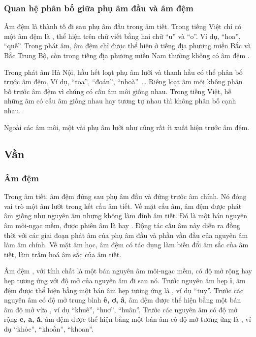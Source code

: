 \documentclass[a4paper,oneside,14pt]{extbook} %
\begin{document}
\subsubsection{Quan hệ phân bố giữa phụ âm đầu và âm đệm}

Âm đệm là thành tố đi sau phụ âm đầu trong âm tiết. Trong tiếng Việt
chỉ có một âm đệm là , thể hiện trên chữ viết bằng hai
chữ ``u'' và ``o''. Ví dụ, ``hoa'', ``quế''. Trong phát âm, âm đệm chỉ
được thể hiện ở tiếng địa phương miền Bắc và Bắc Trung Bộ, còn trong
tiếng địa phương miền Nam thường không có âm đệm .

Trong phát âm Hà Nội, hầu hết loạt phụ âm lưỡi và thanh hầu có thể
phân bố trước âm đệm. Ví dụ, ``toa'', ``đoán'', ``nhoà''~\ldots{} Riêng
loạt âm môi  không phân bố trước âm đệm
 vì chúng có cấu âm môi giống nhau. Trong tiếng Việt,
hễ những âm có cấu âm giống nhau hay tương tự nhau thì không phân bố
cạnh nhau.

Ngoài các âm môi, một vài phụ âm lưỡi như  cũng
rất ít xuất hiện trước âm đệm.

\subsection{Vần}


\subsubsection{Âm đệm}

Trong âm tiết, âm đệm  đứng sau phụ âm đầu và đứng
trước âm chính. Nó đóng vai trò một âm lướt trong kết cấu âm tiết. Về
mặt cấu âm, âm đệm  được phát âm giống như nguyên âm
\textipa{[u]} nhưng không làm đỉnh âm tiết. Đó là một bán nguyên âm
môi-ngạc mềm, được phiên âm là \textipa{[-u-]} hay
\textipa{[-w-]}. Động tác cấu âm này diễn ra đồng thời với các giai
đoạn phát âm của phụ âm đầu và phần vần đầu của nguyên âm làm âm
chính. Về mặt âm học, âm đệm  có tác dụng làm biến đổi
âm sắc của âm tiết, làm trầm hoá âm sắc của âm tiết.

Âm đệm , với tính chất là một bán nguyên âm môi-ngạc
mềm, có độ mở rộng hay hẹp tương ứng với độ mở của nguyên âm đi sau
nó. Trước nguyên âm hẹp \textbf{i}, âm đệm  được thể
hiện bằng một bán âm hẹp tương ứng là \textipa{[u]}, ví dụ
``tuy''. Trước các nguyên âm có độ mở trung bình \textbf{ê, ơ, â}, âm
đệm   được thể hiện bằng một bán âm độ mở vừa
\textipa{[o]}, ví dụ ``khuê'', ``huơ'', ``huân''. Trước các nguyên âm
có độ mở rộng \textbf{e, a, ă}, âm đệm   được thể hiện
bằng một bán âm có độ mở tương ứng là \textipa{[O]}, ví dụ ``khỏe'',
``khoắn'', ``khoan''.
\end{document}
